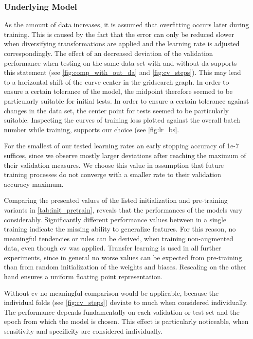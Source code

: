 \subsubsection{Underlying Model}

As the amount of data increases, it is assumed that \gls{overfitting} occurs later during training. This is caused by the fact that the error can only be reduced slower when diversifying transformations are applied and the learning rate is adjusted correspondingly. The effect of an decreased deviation of the validation performance when testing on the same data set with and without \acrshort{da} supports this statement (see \cref{fig:comp_with_out_da} and \cref{fig:cv_steps}). This may lead to a horizontal shift of the curve center in the gridsearch graph. In order to ensure a certain tolerance of the model, the midpoint therefore seemed to be particularly suitable for initial tests. In order to ensure a certain tolerance against changes in the data set, the center point for tests seemed to be particularly suitable. Inspecting the curves of training loss plotted against the overall batch number while training, supports our choice (see \cref{fig:lr_bs}.

For the smallest of our tested learning rates an early stopping accuracy of 1e-7 suffices, since we observe mostly larger deviations after reaching the maximum of their validation measures. We choose this value in assumption that future training processes do not converge with a smaller rate to their validation accuracy maximum.

Comparing the presented values of the listed initialization and pre-training variants in \cref{tab:init_pretrain}, reveals that the performances of the models vary considerably. Significantly different performance values between  in a single training indicate the missing ability to generalize features. For this reason, no meaningful tendencies or rules can be derived, when training non-augmented data, even though \acrshort{cv} was applied. Transfer learning is used in all further experiments, since in general no worse values can be expected from pre-training than from random initialization of the weights and biases. Rescaling on the other hand ensures a uniform floating point representation.

Without \acrshort{cv} no meaningful comparison would be applicable, because the individual folds (see \cref{fig:cv_steps}) deviate to much when considered individually. The performance depends fundamentally on each validation or test set and the epoch from which the model is chosen. This effect is particularly noticeable, when sensitivity and specificity are considered individually.

